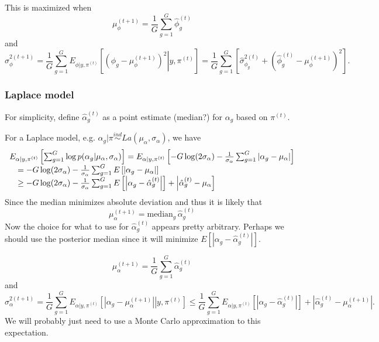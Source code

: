 \documentclass{article}
\begin{document}
This is maximized when 
\[ \mu_\phi^{(t+1)} = \frac{1}{G} \sum_{g=1}^G \hat{\phi}_{g}^{(t)} \]
and
\[ 
\sigma_\phi^{2(t+1)} 
= \frac{1}{G} \sum_{g=1}^G E_{\phi|y,\pi^{(t)}}\left[\left.\left(\phi_g-\mu_\phi^{(t+1)}\right)^2\right|y,\pi^{(t)}\right] 
= \frac{1}{G} \sum_{g=1}^G \left[ \hat{\sigma}_{\phi_g}^{2(t)} + \left(\hat{\phi}_{g}^{(t)}-\mu^{(t+1)}_\phi\right)^2 \right].
\] 



\subsubsection{Laplace model}

For simplicity, define $\hat{\alpha}_{g}^{(t)}$ as a point estimate (median?) for $\alpha_g$ based on $\pi^{(t)}$.

For a Laplace model, e.g. $\alpha_g|\pi \stackrel{ind}{\sim} La(\mu_\alpha,\sigma_\alpha)$, we have 
\[ 
\begin{array}{rl}
\multicolumn{2}{l}{
E_{\alpha|y,\pi^{(t)}} \left[ \sum_{g=1}^G \log p(\alpha_g|\mu_\alpha, \sigma_\alpha) \right] = 
E_{\alpha|y,\pi^{(t)}} \left[ -G\log(2\sigma_\alpha) - \frac{1}{\sigma_\alpha} \sum_{g=1}^G |\alpha_g-\mu_\alpha| \right]} \\
&= -G\log(2\sigma_\alpha) - \frac{1}{\sigma_\alpha} \sum_{g=1}^G E \left[|\alpha_g-\mu_\alpha| \right] \\
&\ge -G\log(2\sigma_\alpha) - \frac{1}{\sigma_\alpha} \sum_{g=1}^G E\left[\left|\alpha_g-\hat{\alpha}_{g}^{(t)}\right|\right] + \left|\hat{\alpha}_{g}^{(t)}-\mu_\alpha\right] \\
\end{array}
\]
Since the median minimizes absolute deviation and thus it is likely that 
\[ 
\mu_\alpha^{(t+1)} = \mbox{median}_g\, \hat{\alpha}_{g}^{(t)}
\]
Now the choice for what to use for $\hat{\alpha}_{g}^{(t)}$ appears pretty arbitrary. Perhaps we should use the posterior median since it will minimize $E\left[\left|\alpha_g-\hat{\alpha}_{g}^{(t)}\right|\right]$.

\[
\mu_\alpha^{(t+1)} = \frac{1}{G} \sum_{g=1}^G \hat{\alpha}_{g}^{(t)} \]
and 
\[
\sigma_\alpha^{2(t+1)} 
= \frac{1}{G} \sum_{g=1}^G E_{\alpha|y,\pi^{(t)}}\left[\left.\left|\alpha_g-\mu_\alpha^{(t+1)}\right|\right|y,\pi^{(t)}\right] 
\le  \frac{1}{G} \sum_{g=1}^G E_{\alpha|y,\pi^{(t)}}\left[\left|\alpha_g-\hat{\alpha}_{g}^{(t)}\right|\right] + \left|\hat{\alpha}_{g}^{(t)}-\mu^{(t+1)}_\alpha\right| .
\] 
We will probably just need to use a Monte Carlo approximation to this expectation. 
\end{document}
